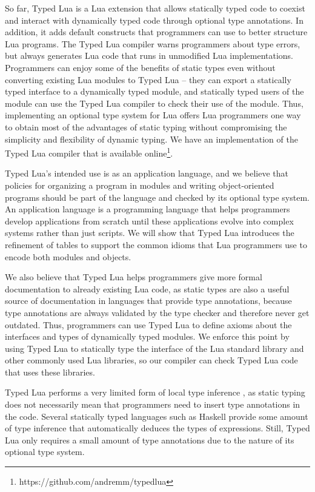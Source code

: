 So far, Typed Lua is a Lua extension that allows statically typed
code to coexist and interact with dynamically typed code
through optional type annotations.
In addition, it adds default constructs that programmers can use
to better structure Lua programs.
The Typed Lua compiler warns programmers about type errors,
but always generates Lua code that runs in unmodified Lua implementations.
Programmers can enjoy some of the benefits of static types
even without converting existing Lua modules to Typed Lua --
they can export a statically typed interface to a dynamically typed module,
and statically typed users of the module can use the Typed Lua compiler
to check their use of the module.
Thus, implementing an optional type system for Lua offers Lua
programmers one way to obtain most of the advantages of static typing
without compromising the simplicity and flexibility of dynamic typing.
We have an implementation of the Typed Lua compiler that is
available online\footnote{https://github.com/andremm/typedlua}.

Typed Lua's intended use is as an application language, and
we believe that policies for organizing a program in modules and writing
object-oriented programs should be part of the language and
checked by its optional type system.
An application language is a programming language that helps
programmers develop applications from scratch until these
applications evolve into complex systems rather than just scripts.
We will show that Typed Lua introduces the refinement of
tables to support the common idioms that Lua programmers use
to encode both modules and objects.

We also believe that Typed Lua helps programmers give more
formal documentation to already existing Lua code, as static types
are also a useful source of documentation in languages that provide
type annotations, because type annotations are always validated by
the type checker and therefore never get outdated.
Thus, programmers can use Typed Lua to define axioms about the
interfaces and types of dynamically typed modules.
We enforce this point by using Typed Lua to statically type
the interface of the Lua standard library and other commonly used
Lua libraries, so our compiler can check Typed Lua code that uses
these libraries.

Typed Lua performs a very limited form of local type inference
\cite{pierce2000lti}, as static typing does not necessarily mean
that programmers need to insert type annotations in the code.
Several statically typed languages such as Haskell provide some
amount of type inference that automatically deduces the types of
expressions.
Still, Typed Lua only requires a small amount of type annotations
due to the nature of its optional type system.

